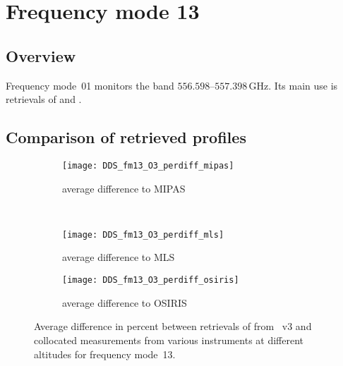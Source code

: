 \section{Frequency mode 13}
\label{sec:fm13}

\subsection{Overview}
\label{sec:fm13:overview}
Frequency mode~01 monitors the band $556.598$--$557.398\,\mathrm{GHz}$. Its
main use is retrievals of  and .


\subsection{Comparison of retrieved profiles}
\label{sec:fm13:comparison}



\begin{figure}[htpb]
    \centering
    \begin{subfigure}[b]{0.49\textwidth}
        \texttt{[image: DDS\_fm13\_O3\_perdiff\_mipas]}
        \caption{average difference to MIPAS}
        \label{fig:fm13:O3:profiles:MIPAS}
    \end{subfigure}
    \,
    \begin{subfigure}[b]{0.49\textwidth}
        \texttt{[image: DDS\_fm13\_O3\_perdiff\_mls]}
        \caption{average difference to MLS}
        \label{fig:fm13:O3:profiles:MLS}
    \end{subfigure}

    \begin{subfigure}[b]{0.49\textwidth}
        \texttt{[image: DDS\_fm13\_O3\_perdiff\_osiris]}
        \caption{average difference to OSIRIS}
        \label{fig:fm13:O3:profiles:OSIRIS}
    \end{subfigure}
    \caption{Average difference in percent between retrievals of 
    from \smr~v3 and collocated measurements from various instruments at
    different altitudes for frequency mode~13.}

    \label{fig:fm13:O3:profiles}
\end{figure}


